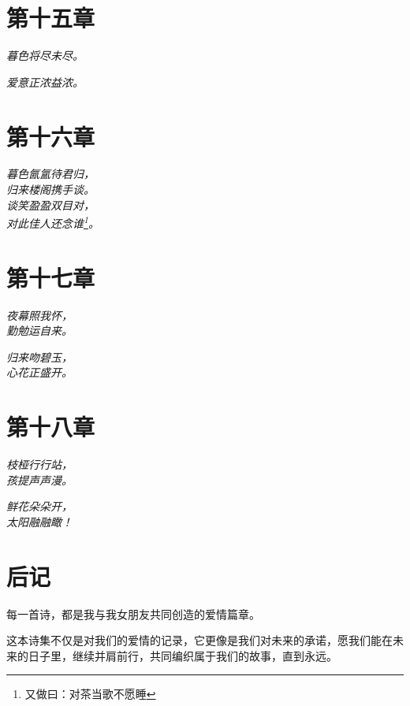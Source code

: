 \documentclass[12pt, a4paper, oneside]{book}
\newenvironment{poem}
  {\vspace{1em}\begin{flushleft}\itshape}
  {\end{flushleft}\vspace{1em}}
\begin{document}
\chapter{第十五章}
\begin{poem}
暮色将尽未尽。 \\
\end{poem}
\begin{poem}
爱意正浓益浓。\\
\end{poem}

\chapter{第十六章}
\begin{poem}
暮色氤氲待君归，\\
归来楼阁携手谈。\\
谈笑盈盈双目对，\\
对此佳人还念谁\footnote{又做曰：对茶当歌不愿睡}。\\
\end{poem}

\chapter{第十七章}
\begin{poem}
夜幕照我怀，\\
勤勉运自来。\\
\end{poem}
\begin{poem}
归来吻碧玉，\\
心花正盛开。\\
\end{poem}

\chapter{第十八章}
\begin{poem}
枝桠行行站，\\
孩提声声漫。\\
\end{poem}
\begin{poem}
鲜花朵朵开，\\
太阳融融瞰！\\
\end{poem}

\chapter*{后记}
每一首诗，都是我与我女朋友共同创造的爱情篇章。

这本诗集不仅是对我们的爱情的记录，它更像是我们对未来的承诺，愿我们能在未来的日子里，继续并肩前行，共同编织属于我们的故事，直到永远。
\end{document}
